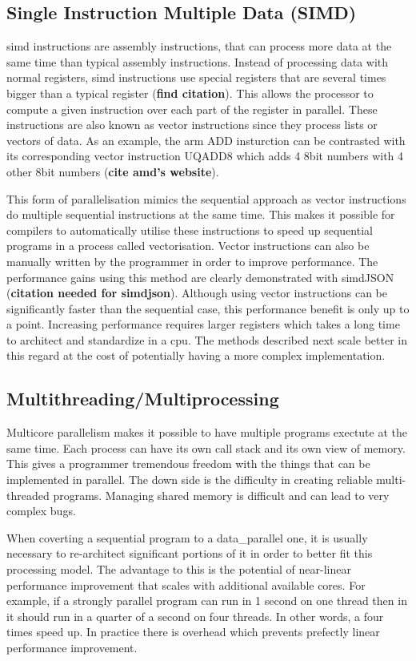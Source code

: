 \subsection{Single Instruction Multiple Data (SIMD)}
\gls{simd} instructions are assembly instructions, that can process more data
at the same time than typical assembly instructions. Instead of processing data
with normal registers, \gls{simd} instructions use special registers that are
several times bigger than a typical register (\textbf{find citation}). This allows
the processor to compute a given instruction over each part of the register in
parallel. These instructions are also known as vector instructions since they
process lists or vectors of data. As an example, the arm ADD insturction can be
contrasted with its corresponding vector instruction UQADD8 which adds 4 8bit
numbers with 4 other 8bit numbers (\textbf{cite amd's website}).

This form of parallelisation mimics the sequential approach as vector
instructions do multiple sequential instructions at the same time. This makes
it possible for compilers to automatically utilise these instructions to speed
up sequential programs in a process called vectorisation. Vector instructions
can also be manually written by the programmer in order to improve performance.
The performance gains using this method are clearly demonstrated with simdJSON
(\textbf{citation needed for simdjson}). Although using vector instructions can
be significantly faster than the sequential case, this performance benefit is
only up to a point. Increasing performance requires larger registers which takes
a long time to architect and standardize in a \gls{cpu}. The methods described
next scale better in this regard at the cost of potentially having a more
complex implementation.

\subsection{Multithreading/Multiprocessing}
Multicore parallelism makes it possible to have multiple programs exectute at
the same time. Each process can have its own call stack and its own view of
memory. This gives a programmer tremendous freedom with the things that can be
implemented in parallel. The down side is the difficulty in creating reliable
multi-threaded programs. Managing shared memory is difficult and can lead to
very complex bugs.

When coverting a sequential program to a \gls{data_parallel} one, it is usually
necessary to re-architect significant portions of it in order to better fit
this processing model. The advantage to this is the potential of near-linear
performance improvement that scales with additional available cores. For
example, if a strongly parallel program can run in 1 second on one thread then
in it should run in a quarter of a second on four threads. In other words, a
four times speed up. In practice there is overhead which prevents prefectly
linear performance improvement.


